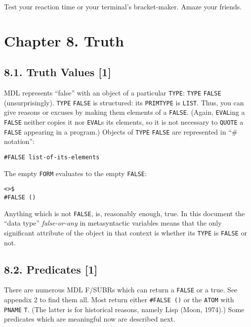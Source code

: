 \documentclass[a4paper,]{article}
\begin{document}
Test your reaction time or your terminal's bracket-maker. Amaze your friends.

\section{Chapter 8. Truth}\label{chapter-8.-truth}

\subsection{8.1. Truth Values {[}1{]}}\label{truth-values-1}

MDL represents ``false'' with an object of a particular \texttt{TYPE}: \texttt{TYPE}
\texttt{FALSE} (unsurprisingly). \texttt{TYPE} \texttt{FALSE} is structured: its
\texttt{PRIMTYPE} is \texttt{LIST}. Thus, you can give reasons or excuses by making them elements of a \texttt{FALSE}.
(Again, \texttt{EVAL}ing a \texttt{FALSE} neither copies it nor \texttt{EVAL}s its elements, so it is not necessary to
\texttt{QUOTE} a \texttt{FALSE} appearing in a program.) Objects of \texttt{TYPE} \texttt{FALSE} are represented in ``\#
notation'':

\begin{verbatim}
#FALSE list-of-its-elements
\end{verbatim}

The empty \texttt{FORM} evaluates to the empty \texttt{FALSE}:

\begin{verbatim}
<>$
#FALSE ()
\end{verbatim}

Anything which is not \texttt{FALSE}, is, reasonably enough, true. In this document the ``data type'' \emph{false-or-any}
in metasyntactic variables means that the only significant attribute of the object in that context is whether its
\texttt{TYPE} is \texttt{FALSE} or not.

\subsection{8.2. Predicates {[}1{]}}\label{predicates-1}

There are numerous MDL F/SUBRs which can return a \texttt{FALSE} or a true. See appendix 2 to find them all. Most return
either \texttt{\#FALSE\ ()} or the \texttt{ATOM} with \texttt{PNAME} \texttt{T}. (The latter is
for historical reasons, namely Lisp (Moon, 1974).) Some predicates which are meaningful now are described next.
\end{document}
